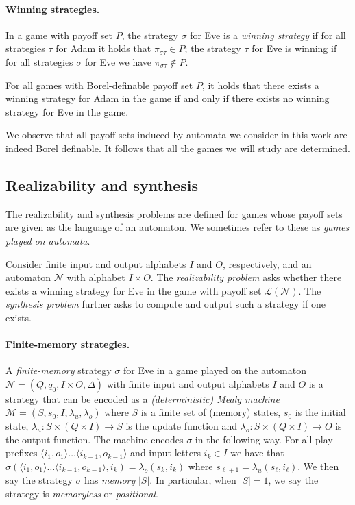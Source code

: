 \documentclass[runningheads,a4paper,draft]{llncs}
\newcommand{\eve}{Eve\xspace}
\newcommand{\adam}{Adam\xspace}
\newcommand{\calN}{\mathcal{N}}
\newcommand{\calM}{\mathcal{M}}
\newcommand{\lang}[1]{\mathcal{L}({#1})}
\newcommand{\out}[2]{\pi_{#1#2}}
\begin{document}
\paragraph*{Winning strategies.}
In a game with payoff set $P$, the strategy $\sigma$ for \eve is a \emph{winning
strategy} if for all strategies $\tau$ for \adam it holds that
$\out{\sigma}{\tau} \in P$; the strategy $\tau$ for \eve is winning if for all
strategies $\sigma$ for \eve we have $\out{\sigma}{\tau} \not\in P$.

\begin{proposition}
  For all games with Borel-definable payoff set $P$, it holds that there
  exists a winning strategy for \adam in the game if and only if there exists
  no winning strategy for \eve in the game.
\end{proposition}
We observe that all payoff sets induced by automata we consider in this work
are indeed Borel definable. It follows that all the games we will study are
determined.

\subsection{Realizability and synthesis}
The realizability and synthesis problems are defined for games whose payoff sets
are given as the language of an automaton. We sometimes refer to these as
\emph{games played on automata}.
\begin{definition}[Problems]
  Consider finite input and output alphabets $I$ and $O$, respectively, and
  an automaton $\calN$ with alphabet $I \times O$.
  The \emph{realizability problem} asks whether
  there exists a winning strategy for \eve in the game with payoff set 
  $\lang{\calN}$. The \emph{synthesis problem}
  further asks to compute and output such a strategy if one exists.
\end{definition}

\paragraph{Finite-memory strategies.}
A \emph{finite-memory} strategy $\sigma$ for \eve in a game played on the
automaton $\calN =
(Q,q_0,I \times O,\Delta)$ with finite input and
output alphabets $I$ and $O$ is a strategy that can be encoded as a
\emph{(deterministic) Mealy machine} $\calM = (S,s_0,I, \lambda_u,\lambda_o)$
where $S$ is a finite set of (memory) states, $s_0$ is the initial state,
$\lambda_u : S \times (Q \times I) \to S$ is the update function and $\lambda_o
: S \times (Q \times I) \to O$ is the output function. The machine encodes
$\sigma$ in the following way. For all play prefixes $\langle i_1,  o_1\rangle
\dots \langle i_{k-1}, o_{k-1} \rangle$ and input letters $i_k \in I$ we have
that $\sigma(\langle i_1, o_1\rangle \dots \langle i_{k-1}, o_{k-1} \rangle,
i_k) = \lambda_o(s_k,i_k)$ where $s_{\ell + 1} =
\lambda_u(s_\ell,i_\ell)$. We then say the strategy $\sigma$ has \emph{memory}
$|S|$. In particular, when $|S| = 1$, we say the strategy is \emph{memoryless}
or \emph{positional}.
\end{document}
